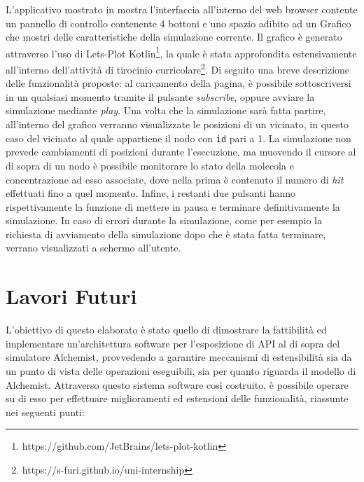 L'applicativo mostrato in  mostra l'interfaccia all'interno del web browser contente un pannello di controllo contenente 4 bottoni e uno spazio adibito
ad un Grafico che mostri delle caratteristiche della simulazione corrente. Il grafico è generato attraverso l'uso di Lets-Plot Kotlin\footnote{https://github.com/JetBrains/lets-plot-kotlin},
la quale è stata approfondita estensivamente all'interno dell'attività di tirocinio curricolare\footnote{https://s-furi.github.io/uni-internship}. Di seguito una breve descrizione delle
funzionalità proposte: al caricamento della pagina, è possibile sottoscriversi in un qualsiasi momento tramite il pulsante \textit{subscribe}, oppure avviare la simulazione mediante \textit{play}.
Una volta che la simulazione sarà fatta partire, all'interno del grafico verranno visualizzate le posizioni di un vicinato, in questo caso del vicinato al quale appartiene il nodo
con \texttt{id} pari a 1. La simulazione non prevede cambiamenti di posizioni durante l'esecuzione, ma muovendo il cursore al di sopra di un nodo è possibile monitorare lo stato
della molecola e concentrazione ad esso associate, dove nella prima è contenuto il numero di \textit{hit} effettuati fino a quel momento. Infine, i restanti due pulsanti hanno rispettivamente
la funzione di mettere in pausa e terminare definitivamente la simulazione. In caso di errori durante la simulazione, come per esempio la richiesta di avviamento della simulazione
dopo che è stata fatta terminare, verrano visualizzati a schermo all'utente.

\section{Lavori Futuri}\label{sec:future-works}
L'obiettivo di questo elaborato è stato quello di dimostrare la fattibilità ed implementare un'architettura software per l'esposizione di \ac{API} al di sopra del simulatore Alchemist,
provvedendo a garantire meccanismi di estensibilità sia da un punto di vista delle operazioni eseguibili, sia per quanto riguarda il modello di Alchemist.
Attraverso questo sistema software così costruito, è possibile operare su di esso per effettuare miglioramenti ed estensioni delle funzionalità, riassunte nei seguenti punti:

